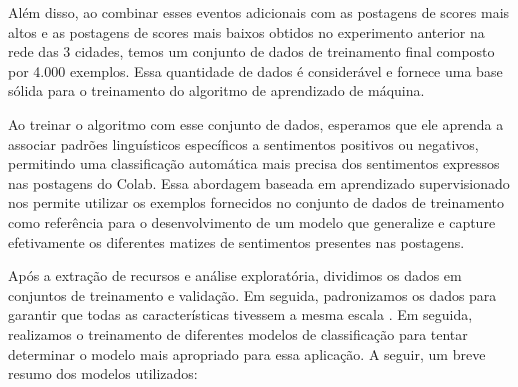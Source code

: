 Além disso, ao combinar esses eventos adicionais com as postagens de scores mais altos e as postagens de scores mais baixos obtidos no experimento anterior na rede das 3 cidades, temos um conjunto de dados de treinamento final composto por 4.000 exemplos. Essa quantidade de dados é considerável e fornece uma base sólida para o treinamento do algoritmo de aprendizado de máquina.

Ao treinar o algoritmo com esse conjunto de dados, esperamos que ele aprenda a associar padrões linguísticos específicos a sentimentos positivos ou negativos, permitindo uma classificação automática mais precisa dos sentimentos expressos nas postagens do Colab. Essa abordagem baseada em aprendizado supervisionado nos permite utilizar os exemplos fornecidos no conjunto de dados de treinamento como referência para o desenvolvimento de um modelo que generalize e capture efetivamente os diferentes matizes de sentimentos presentes nas postagens.

Após a extração de recursos e análise exploratória, dividimos os dados em conjuntos de treinamento e validação. Em seguida, padronizamos os dados para garantir que todas as características tivessem a mesma escala \cite{2000_Jain}. Em seguida, realizamos o treinamento de diferentes modelos de classificação para tentar determinar o modelo mais apropriado para essa aplicação. A seguir, um breve resumo dos modelos utilizados:

